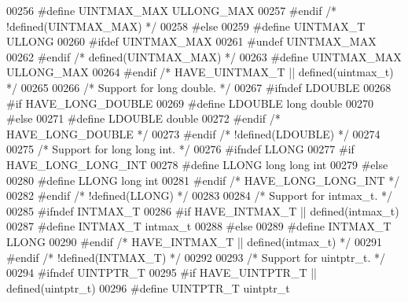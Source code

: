 \begin{DoxyCode}
{00256 \textcolor{preprocessor}{#define UINTMAX\_MAX ULLONG\_MAX}
00257 \textcolor{preprocessor}{#endif  }\textcolor{comment}{/* !defined(UINTMAX\_MAX) */}\textcolor{preprocessor}{}
00258 \textcolor{preprocessor}{#else}
00259 \textcolor{preprocessor}{#define UINTMAX\_T ULLONG}
00260 \textcolor{preprocessor}{#ifdef UINTMAX\_MAX}
00261 \textcolor{preprocessor}{#undef UINTMAX\_MAX}
00262 \textcolor{preprocessor}{#endif  }\textcolor{comment}{/* defined(UINTMAX\_MAX) */}\textcolor{preprocessor}{}
00263 \textcolor{preprocessor}{#define UINTMAX\_MAX ULLONG\_MAX}
00264 \textcolor{preprocessor}{#endif  }\textcolor{comment}{/* HAVE\_UINTMAX\_T || defined(uintmax\_t) */}\textcolor{preprocessor}{}
00265 
00266 \textcolor{comment}{/* Support for long double. */}
00267 \textcolor{preprocessor}{#ifndef LDOUBLE}
00268 \textcolor{preprocessor}{#if HAVE\_LONG\_DOUBLE}
00269 \textcolor{preprocessor}{#define LDOUBLE long double}
00270 \textcolor{preprocessor}{#else}
00271 \textcolor{preprocessor}{#define LDOUBLE double}
00272 \textcolor{preprocessor}{#endif  }\textcolor{comment}{/* HAVE\_LONG\_DOUBLE */}\textcolor{preprocessor}{}
00273 \textcolor{preprocessor}{#endif  }\textcolor{comment}{/* !defined(LDOUBLE) */}\textcolor{preprocessor}{}
00274 
00275 \textcolor{comment}{/* Support for long long int. */}
00276 \textcolor{preprocessor}{#ifndef LLONG}
00277 \textcolor{preprocessor}{#if HAVE\_LONG\_LONG\_INT}
00278 \textcolor{preprocessor}{#define LLONG long long int}
00279 \textcolor{preprocessor}{#else}
00280 \textcolor{preprocessor}{#define LLONG long int}
00281 \textcolor{preprocessor}{#endif  }\textcolor{comment}{/* HAVE\_LONG\_LONG\_INT */}\textcolor{preprocessor}{}
00282 \textcolor{preprocessor}{#endif  }\textcolor{comment}{/* !defined(LLONG) */}\textcolor{preprocessor}{}
00283 
00284 \textcolor{comment}{/* Support for intmax\_t. */}
00285 \textcolor{preprocessor}{#ifndef INTMAX\_T}
00286 \textcolor{preprocessor}{#if HAVE\_INTMAX\_T || defined(intmax\_t)}
00287 \textcolor{preprocessor}{#define INTMAX\_T intmax\_t}
00288 \textcolor{preprocessor}{#else}
00289 \textcolor{preprocessor}{#define INTMAX\_T LLONG}
00290 \textcolor{preprocessor}{#endif  }\textcolor{comment}{/* HAVE\_INTMAX\_T || defined(intmax\_t) */}\textcolor{preprocessor}{}
00291 \textcolor{preprocessor}{#endif  }\textcolor{comment}{/* !defined(INTMAX\_T) */}\textcolor{preprocessor}{}
00292 
00293 \textcolor{comment}{/* Support for uintptr\_t. */}
00294 \textcolor{preprocessor}{#ifndef UINTPTR\_T}
00295 \textcolor{preprocessor}{#if HAVE\_UINTPTR\_T || defined(uintptr\_t)}
00296 \textcolor{preprocessor}{#define UINTPTR\_T uintptr\_t}
}
\end{DoxyCode}
